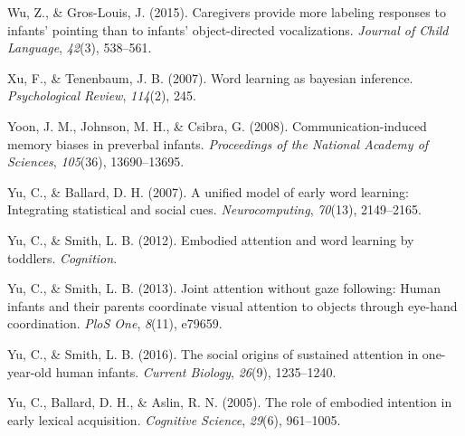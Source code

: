 \documentclass[a4paper,man,apacite,floatsintext]{apa6}
\begin{document}
\hypertarget{ref-wu2015caregivers}{}
Wu, Z., \& Gros-Louis, J. (2015). Caregivers provide more labeling
responses to infants' pointing than to infants' object-directed
vocalizations. \emph{Journal of Child Language}, \emph{42}(3), 538--561.

\hypertarget{ref-xu2007word}{}
Xu, F., \& Tenenbaum, J. B. (2007). Word learning as bayesian inference.
\emph{Psychological Review}, \emph{114}(2), 245.

\hypertarget{ref-yoon2008communication}{}
Yoon, J. M., Johnson, M. H., \& Csibra, G. (2008). Communication-induced
memory biases in preverbal infants. \emph{Proceedings of the National
Academy of Sciences}, \emph{105}(36), 13690--13695.

\hypertarget{ref-yu2007unified}{}
Yu, C., \& Ballard, D. H. (2007). A unified model of early word
learning: Integrating statistical and social cues.
\emph{Neurocomputing}, \emph{70}(13), 2149--2165.

\hypertarget{ref-yu2012embodied}{}
Yu, C., \& Smith, L. B. (2012). Embodied attention and word learning by
toddlers. \emph{Cognition}.

\hypertarget{ref-yu2013joint}{}
Yu, C., \& Smith, L. B. (2013). Joint attention without gaze following:
Human infants and their parents coordinate visual attention to objects
through eye-hand coordination. \emph{PloS One}, \emph{8}(11), e79659.

\hypertarget{ref-yu2016social}{}
Yu, C., \& Smith, L. B. (2016). The social origins of sustained
attention in one-year-old human infants. \emph{Current Biology},
\emph{26}(9), 1235--1240.

\hypertarget{ref-yu2005role}{}
Yu, C., Ballard, D. H., \& Aslin, R. N. (2005). The role of embodied
intention in early lexical acquisition. \emph{Cognitive Science},
\emph{29}(6), 961--1005.


\end{document}
